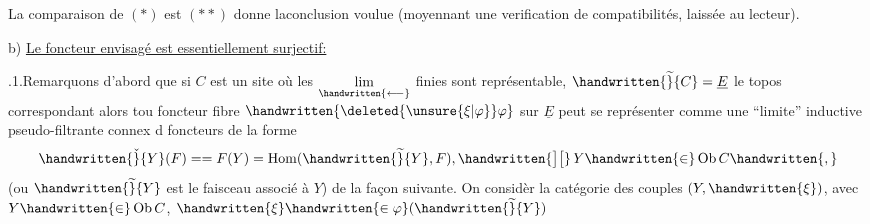 \noindent La comparaison de $(*)$ est $(**)$ donne la\handwritten{$\mid$}conclusion voulue (moyennant une verification de compatibilités, laissée au lecteur).

\noindent{}%
b) \uline{Le foncteur envisagé est essentiellement surjectif:}

.1.\quad Remarquons d'abord que si $C$ est un site où les $\mathop{\underset{\handwritten{\longleftarrow}}{\mathrm{lim}}}\limits$ finies sont représentable, $\handwritten{\widetilde}{C} = \underline{E}$ le topos correspondant alors\handwritten{,} tou%
foncteur fibre $\handwritten{\deleted{\unsure{\xi|\varphi}}\varphi}$ sur $\underline E$ peut se représenter comme une ``limite''
\margin{\handwritten{$/\quad /\quad\varphi$}}
inductive pseudo-filtrante connex d foncteurs de la forme
\margin{\handwritten{$]\,[ $}}
\[
\handwritten{\check}{Y}(F) == F(Y) = \operatorname{Hom}(\handwritten{\widetilde}{Y},F),\handwritten{\big]\big[}\, Y\handwritten{\in}\operatorname{Ob} C\handwritten{,}
\]
(ou $\handwritten{\widetilde}{Y}$ est le faisceau associé à $Y$)\handwritten{,} de la façon suivante. On considèr
\margin{\handwritten{,}}
la catégorie des couples $(Y,\handwritten{\xi})$, avec $Y\handwritten{\in}\operatorname{Ob} C$, $\handwritten{\xi}\handwritten{\in\varphi}(\handwritten{\widetilde}{Y})$
\endgroup

\clearpage
